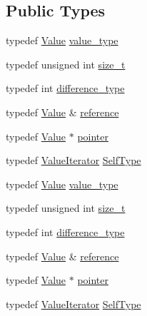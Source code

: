 \subsection*{Public Types}
\begin{DoxyCompactItemize}
\item 
typedef \hyperlink{class_json_1_1_value}{Value} \hyperlink{class_json_1_1_value_iterator_a2c5ba7be611f05546530c8a88b2d2e37}{value\+\_\+type}
\item 
typedef unsigned int \hyperlink{class_json_1_1_value_iterator_a308b8932ffc83eaa9d12dadd5c11a7dd}{size\+\_\+t}
\item 
typedef int \hyperlink{class_json_1_1_value_iterator_a2be1a9aa60bbfc8812e9dd1a7f1a8786}{difference\+\_\+type}
\item 
typedef \hyperlink{class_json_1_1_value}{Value} \& \hyperlink{class_json_1_1_value_iterator_ae87929b4567aa00372cf602c43b57160}{reference}
\item 
typedef \hyperlink{class_json_1_1_value}{Value} $\ast$ \hyperlink{class_json_1_1_value_iterator_acec45feb1ef1f3bf81240157d06d5432}{pointer}
\item 
typedef \hyperlink{class_json_1_1_value_iterator}{Value\+Iterator} \hyperlink{class_json_1_1_value_iterator_a23357670fdad61792670d86f62db7e16}{Self\+Type}
\item 
typedef \hyperlink{class_json_1_1_value}{Value} \hyperlink{class_json_1_1_value_iterator_a2c5ba7be611f05546530c8a88b2d2e37}{value\+\_\+type}
\item 
typedef unsigned int \hyperlink{class_json_1_1_value_iterator_a308b8932ffc83eaa9d12dadd5c11a7dd}{size\+\_\+t}
\item 
typedef int \hyperlink{class_json_1_1_value_iterator_a2be1a9aa60bbfc8812e9dd1a7f1a8786}{difference\+\_\+type}
\item 
typedef \hyperlink{class_json_1_1_value}{Value} \& \hyperlink{class_json_1_1_value_iterator_ae87929b4567aa00372cf602c43b57160}{reference}
\item 
typedef \hyperlink{class_json_1_1_value}{Value} $\ast$ \hyperlink{class_json_1_1_value_iterator_acec45feb1ef1f3bf81240157d06d5432}{pointer}
\item 
typedef \hyperlink{class_json_1_1_value_iterator}{Value\+Iterator} \hyperlink{class_json_1_1_value_iterator_a23357670fdad61792670d86f62db7e16}{Self\+Type}
\end{DoxyCompactItemize}
